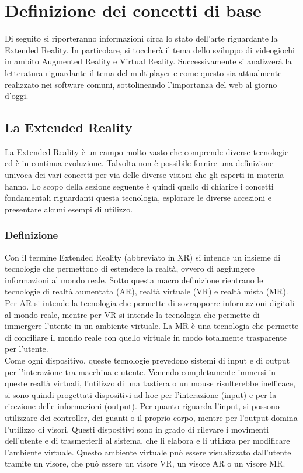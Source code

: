 \chapter{Definizione dei concetti di base}\label{chap:Letteratura}
Di seguito si riporteranno informazioni circa lo stato dell'arte riguardante la Extended Reality. In particolare, si toccherà il tema dello sviluppo di videogiochi in ambito 
Augmented Reality e Virtual Reality. Successivamente si analizzerà la letteratura riguardante il tema del multiplayer e come questo sia attualmente realizzato nei software comuni,
sottolineando l'importanza del web al giorno d'oggi.

\section{La Extended Reality}\label{sec:XR}
    La Extended Reality è un campo molto vasto che comprende diverse tecnologie ed è in continua evoluzione. Talvolta non è possibile fornire una definizione univoca dei vari 
    concetti per via delle diverse visioni che gli esperti in materia hanno. Lo scopo della sezione seguente è quindi quello di chiarire i concetti fondamentali riguardanti
    questa tecnologia, esplorare le diverse accezioni e presentare alcuni esempi di utilizzo.
    \subsection{Definizione}\label{subsec:XRDef}
        Con il termine Extended Reality (abbreviato in XR) si intende un insieme di tecnologie che permettono di estendere la realtà, ovvero di aggiungere informazioni al mondo 
        reale. Sotto questa macro definizione rientrano le tecnologie di realtà aumentata (AR), realtà virtuale (VR) e realtà mista (MR). Per AR si intende la tecnologia che permette 
        di sovrapporre informazioni digitali al mondo reale, mentre per VR si intende la tecnologia che permette di immergere l'utente in un ambiente virtuale. La MR è una tecnologia
        che permette di conciliare il mondo reale con quello virtuale in modo totalmente trasparente per l'utente. \\
        Come ogni dispositivo, queste tecnologie prevedono sistemi di input e di output per l'interazione tra macchina e utente. Venendo completamente immersi in queste realtà 
        virtuali, l'utilizzo di una tastiera o un mouse risulterebbe
        inefficace, si sono quindi progettati dispositivi ad hoc per l'interazione (input) e per la ricezione delle informazioni (output). Per quanto riguarda l'input, si possono
        utilizzare dei controller, dei guanti o il proprio corpo, mentre per l'output domina l'utilizzo di visori. Questi dispositivi sono in grado di rilevare i movimenti 
        dell'utente e di trasmetterli al sistema, che li elabora e li utilizza per modificare l'ambiente virtuale. Questo ambiente virtuale può essere visualizzato dall'utente 
        tramite un visore, che può essere un visore VR, un visore AR o un visore MR.
